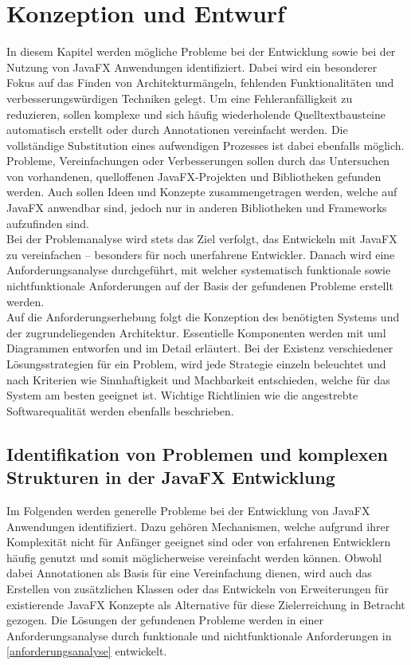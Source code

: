 \chapter{Konzeption und Entwurf}
\label{konzeption_und_entwurf}
In diesem Kapitel werden mögliche Probleme bei der Entwicklung sowie bei der Nutzung von JavaFX Anwendungen identifiziert. Dabei wird ein besonderer Fokus auf das Finden von Architekturmängeln, fehlenden Funktionalitäten und verbesserungswürdigen Techniken gelegt. Um eine Fehleranfälligkeit zu reduzieren, sollen komplexe und sich häufig wiederholende Quelltextbausteine automatisch erstellt oder durch Annotationen vereinfacht werden. Die vollständige Substitution eines aufwendigen Prozesses ist dabei ebenfalls möglich. Probleme, Vereinfachungen oder Verbesserungen sollen durch das Untersuchen von vorhandenen, quelloffenen JavaFX-Projekten und Bibliotheken gefunden werden. Auch sollen Ideen und Konzepte zusammengetragen werden, welche auf JavaFX anwendbar sind, jedoch nur in anderen Bibliotheken und Frameworks aufzufinden sind. \\
Bei der Problemanalyse wird stets das Ziel verfolgt, das Entwickeln mit JavaFX zu vereinfachen -- besonders für noch unerfahrene Entwickler. Danach wird eine Anforderungsanalyse durchgeführt, mit welcher systematisch funktionale sowie nichtfunktionale Anforderungen auf der Basis der gefundenen Probleme erstellt werden. \\
Auf die Anforderungserhebung folgt die Konzeption des benötigten Systems und der zugrundeliegenden Architektur. Essentielle Komponenten werden mit \ac{uml} Diagrammen entworfen und im Detail erläutert. Bei der Existenz verschiedener Lösungsstrategien für ein Problem, wird jede Strategie einzeln beleuchtet und nach Kriterien wie Sinnhaftigkeit und Machbarkeit entschieden, welche für das System am besten geeignet ist. Wichtige Richtlinien wie die angestrebte Softwarequalität werden ebenfalls beschrieben.

\section{Identifikation von Problemen und komplexen Strukturen in der JavaFX Entwicklung}
\label{problemanalyse}
Im Folgenden werden generelle Probleme bei der Entwicklung von JavaFX Anwendungen identifiziert. Dazu gehören Mechanismen, welche aufgrund ihrer Komplexität nicht für Anfänger geeignet sind oder von erfahrenen Entwicklern häufig genutzt und somit möglicherweise vereinfacht werden können. Obwohl dabei Annotationen als Basis für eine Vereinfachung dienen, wird auch das Erstellen von zusätzlichen Klassen oder das Entwickeln von Erweiterungen für existierende JavaFX Konzepte als Alternative für diese Zielerreichung in Betracht gezogen. Die Lösungen der gefundenen Probleme werden in einer Anforderungsanalyse durch funktionale und nichtfunktionale Anforderungen in \autoref{anforderungsanalyse} entwickelt.
